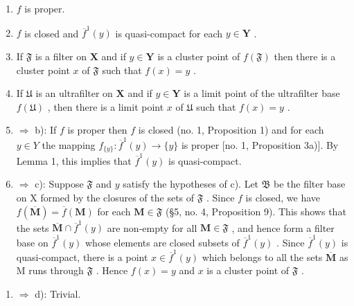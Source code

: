 \begin{enumerate}
\def\labelenumi{\alph{enumi})}
\item
  \(f\) is proper.
\item
  \(f\) is closed and \(\overline{f}^1(y)\) is quasi-compact for each \(y \in \mathbf{Y}\) .
\item
  If \(\mathfrak{F}\) is a filter on \(\mathbf{X}\) and if \(y\in \mathbf{Y}\) is a cluster point of \(f(\mathfrak{F})\) then there is a cluster point \(x\) of \(\mathfrak{F}\) such that \(f(x) = y\) .
\item
  If \(\mathfrak{U}\) is an ultrafilter on \(\mathbf{X}\) and if \(y\in \mathbf{Y}\) is a limit point of the ultrafilter base \(f(\mathfrak{U})\) , then there is a limit point \(x\) of \(\mathfrak{U}\) such that \(f(x) = y\) .
\item
  \(\Longrightarrow\) b): If \(f\) is proper then \(f\) is closed (no. 1, Proposition 1) and for each \(y \in Y\) the mapping \(f_{\{y\}}: \overline{f}^1(y) \to \{y\}\) is proper {[}no. 1, Proposition 3a){]}. By Lemma 1, this implies that \(\overline{f}^1(y)\) is quasi-compact.
\item
  \(\Longrightarrow\) c): Suppose \(\mathfrak{F}\) and \(y\) satisfy the hypotheses of c). Let \(\mathfrak{B}\) be the filter base on X formed by the closures of the sets of \(\mathfrak{F}\) . Since \(f\) is closed, we have \(f(\overline{\mathbf{M}}) = \overline{f}(\mathbf{M})\) for each \(\mathbf{M} \in \mathfrak{F}\) (§5, no. 4, Proposition 9). This shows that the sets \(\overline{\mathbf{M}} \cap \overline{f}^1(y)\) are non-empty for all \(\mathbf{M} \in \mathfrak{F}\) , and hence form a filter base on \(\overline{f}^1(y)\) whose elements are closed subsets of \(\overline{f}^1(y)\) . Since \(\overline{f}^1(y)\) is quasi-compact, there is a point \(x \in \overline{f}^1(y)\) which belongs to all the sets \(\overline{\mathbf{M}}\) as M runs through \(\mathfrak{F}\) . Hence \(f(x) = y\) and \(x\) is a cluster point of \(\mathfrak{F}\) .
\end{enumerate}

\begin{enumerate}
\def\labelenumi{\alph{enumi})}
\setcounter{enumi}{2}
\tightlist
\item
  \(\Longrightarrow\) d): Trivial.
\end{enumerate}

